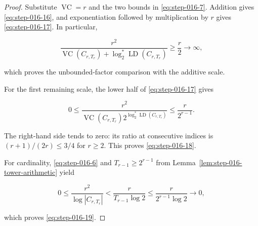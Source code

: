 \begin{proof}
Substitute \(\operatorname{VC}=r\) and the two bounds in \eqref{eq:step-016-7}. Addition
gives \eqref{eq:step-016-16}, and exponentiation followed by multiplication by \(r\) gives
\eqref{eq:step-016-17}. In particular,

\[
\frac{r^2}{
 \operatorname{VC}(C_{r,T_r})
 +\log_2^*\operatorname{LD}(C_{r,T_r})}
\ge\frac r2\longrightarrow\infty,
\]

which proves the unbounded-factor comparison with the additive scale.

For the first remaining scale, the lower half of \eqref{eq:step-016-17} gives

\[
0\le
\frac{r^2}{
 \operatorname{VC}(C_{r,T_r})
 2^{\log_2^*\operatorname{LD}(C_{r,T_r})}}
\le\frac r{2^{r-1}}.
\tag{S16.20}\label{eq:step-016-20}
\]

The right-hand side tends to zero: its ratio at consecutive indices is
\((r+1)/(2r)\le3/4\) for \(r\ge2\). This proves \eqref{eq:step-016-18}.

For cardinality, \eqref{eq:step-016-6} and \(T_{r-1}\ge2^{r-1}\) from
Lemma~\ref{lem:step-016-tower-arithmetic} yield

\[
0\le\frac{r^2}{\log|C_{r,T_r}|}
<\frac{r}{T_{r-1}\log2}
\le\frac{r}{2^{r-1}\log2}\longrightarrow0,
\]

which proves \eqref{eq:step-016-19}. \end{proof}


